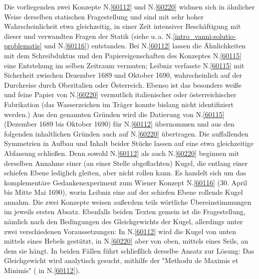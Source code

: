 
\vspace{5mm}
\begin{ledgroup}
\footnotesize
\pstart
\noindent
Die vorliegenden zwei Konzepte N.\;\ref{60112} und N.\;\ref{60220} widmen sich in ähnlicher Weise derselben statischen Fragestellung und sind mit sehr hoher Wahrscheinlicheit etwa gleichzeitig, in einer Zeit intensiver Beschäftigung mit dieser und verwandten Fragen der Statik (siehe u.\,a. N.\;\ref{intro_vanni-solutio-problematis} und N.\;\ref{60116}) entstanden.
\pend
\pstart
Bei N.\;\ref{60112} lassen die Ähnlichkeiten mit dem Schreibduktus und den Papiereigenschaften des Konzeptes N.\;\ref{60115} eine Entstehung im selben Zeitraum vermuten; Leibniz verfasste N.\;\ref{60115} mit Sicherheit zwischen Dezember 1689 und Oktober 1690, wahrscheinlich auf der Durchreise durch Oberitalien oder Österreich.
Ebenso ist das besonders weiße und feine Papier von N.\;\ref{60220} vermutlich italienischer oder österreichischer Fabrikation (das Wasserzeichen im Träger konnte bislang nicht identifiziert werden.)
Aus den genannten Gründen wird die Datierung von N.\;\ref{60115} (Dezember 1689 bis Oktober 1690) für N.\;\ref{60112} übernommen und aus den folgenden inhaltlichen Gründen auch auf N.\;\ref{60220} übertragen.
\pend
\pstart
Die auffallenden Symmetrien in Aufbau und Inhalt beider Stücke lassen auf eine etwa gleichzeitige Abfassung schließen.
Denn sowohl N.\;\ref{60112} als auch N.\;\ref{60220} beginnen mit derselben Annahme 
einer (an einer Stelle abgeflachten) Kugel, die entlang einer schiefen Ebene lediglich gleiten, aber nicht rollen kann. Es handelt sich um das komplementäre Gedankenexperiment zum Wiener Konzept N.\;\ref{60116} (30. April bis Mitte Mai 1690), worin Leibniz eine auf der schiefen Ebene rollende Kugel annahm.
Die zwei Konzepte weisen außerdem teils wörtliche Übereinstimmungen im jeweils ersten Absatz.
Ebenfalls beiden Texten gemein ist die Fragestellung, nämlich nach den Bedingungen des Gleichgewichts der Kugel, allerdings unter zwei verschiedenen Voraussetzungen: In N.\;\ref{60112} wird die Kugel von unten mittels eines Hebels gestützt, in N.\;\ref{60220} aber von oben, mittels eines Seils, an dem sie hängt.
In beiden Fällen führt schließlich derselbe Ansatz zur Lösung: Das Gleichgewicht wird analytisch gesucht, mithilfe der "Methodu de Maximis et Minimis" ( in N.\;\ref{60112}).
\pend
\end{ledgroup}
